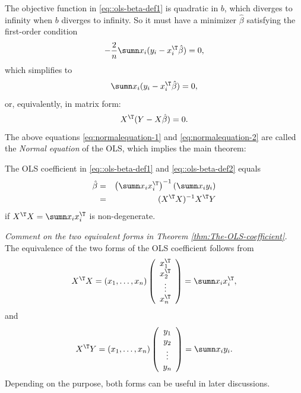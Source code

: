 The objective function in \eqref{eq::ols-beta-def1} is quadratic in $b$, which diverges to infinity when $b$ diverges to infinity. So it must have a minimizer
$\hat{\beta}$ satisfying the first-order condition
\[
-\frac{2}{n}\sumn x_{i}(y_{i}-x_{i}^{\T}\hat{\beta})=0,
\]
which simplifies to 
\begin{equation}
\sumn x_{i}(y_{i}-x_{i}^{\T}\hat{\beta})=0 ,  \label{eq:normalequation-1}
\end{equation}
or, equivalently, in matrix form:
\begin{equation}
X^{\T}(Y-X\hat{\beta})=0 .  \label{eq:normalequation-2}
\end{equation}
The above equations \eqref{eq:normalequation-1} and \eqref{eq:normalequation-2} are called the {\it Normal equation} of the OLS, which implies the main theorem:
\begin{theorem}
\label{thm:The-OLS-coefficient}
The OLS coefficient in \eqref{eq::ols-beta-def1} and \eqref{eq::ols-beta-def2} equals
\begin{eqnarray*}
\hat{\beta}
&=&\left(\sumn x_{i}x_{i}^{\T}\right)^{-1}\left(\sumn x_{i}y_{i}\right) \\
&=& (X^{\T}X)^{-1}X^{\T}Y
\end{eqnarray*}
if $X^{\T}X = \sumn x_{i}x_{i}^{\T}$ is non-degenerate. 
\end{theorem}


\emph{Comment on the two equivalent forms in Theorem \ref{thm:The-OLS-coefficient}.}
The equivalence of the two forms of the OLS coefficient follows from
$$
X^{\T}X = (x_1,\ldots, x_n)  \left(\begin{array}{c}
x_{1}^{\T}\\
x_{2}^{\T}\\
\vdots\\
x_{n}^{\T}
\end{array}\right)
= \sumn x_{i}x_{i}^{\T},
$$
and
$$
X^{\T}Y = (x_1,\ldots, x_n)\left(\begin{array}{c}
y_{1}\\
y_{2}\\
\vdots\\
y_{n}
\end{array}\right)
= \sumn x_{i}y_{i}. 
$$
Depending on the purpose, both forms can be useful in later discussions. 


